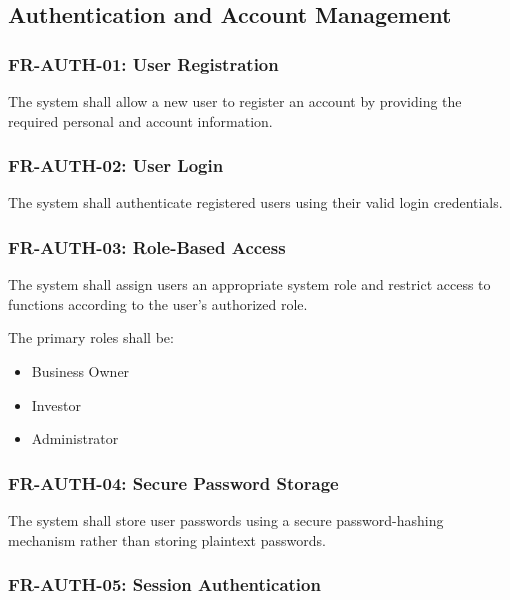 
\subsection{Authentication and Account Management}

\subsubsection{FR-AUTH-01: User Registration}

The system shall allow a new user to register an account by providing the
required personal and account information.

\subsubsection{FR-AUTH-02: User Login}

The system shall authenticate registered users using their valid login
credentials.

\subsubsection{FR-AUTH-03: Role-Based Access}

The system shall assign users an appropriate system role and restrict access
to functions according to the user's authorized role.

The primary roles shall be:

\begin{itemize}
    \item Business Owner
    \item Investor
    \item Administrator
\end{itemize}

\subsubsection{FR-AUTH-04: Secure Password Storage}

The system shall store user passwords using a secure password-hashing
mechanism rather than storing plaintext passwords.

\subsubsection{FR-AUTH-05: Session Authentication}

